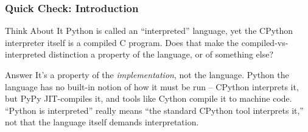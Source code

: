 \begin{frame}[fragile]\frametitle{Quick Check: Introduction}
\begin{block}{Think About It}
Python is called an ``interpreted'' language, yet the CPython interpreter itself is a compiled C program. Does that make the compiled-vs-interpreted distinction a property of the language, or of something else?
\end{block}
\pause
\begin{block}{Answer}
It's a property of the \emph{implementation}, not the language. Python the language has no built-in notion of how it must be run -- CPython interprets it, but PyPy JIT-compiles it, and tools like Cython compile it to machine code. ``Python is interpreted'' really means ``the standard CPython tool interprets it,'' not that the language itself demands interpretation.
\end{block}
\end{frame}
